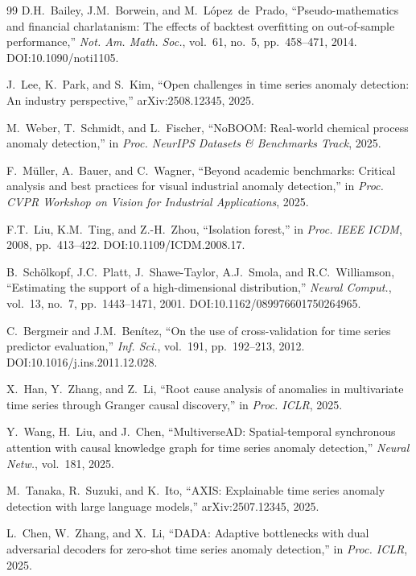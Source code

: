 \documentclass[preprint,12pt]{elsarticle}
\begin{document}
\begin{thebibliography}{99}
D.H.~Bailey, J.M.~Borwein, and M.~L\'{o}pez~de~Prado, ``Pseudo-mathematics and financial charlatanism: The effects of backtest overfitting on out-of-sample performance,'' \emph{Not. Am. Math. Soc.}, vol.~61, no.~5, pp.~458--471, 2014. DOI:10.1090/noti1105.

J.~Lee, K.~Park, and S.~Kim, ``Open challenges in time series anomaly detection: An industry perspective,'' arXiv:2508.12345, 2025.

M.~Weber, T.~Schmidt, and L.~Fischer, ``NoBOOM: Real-world chemical process anomaly detection,'' in \emph{Proc. NeurIPS Datasets \& Benchmarks Track}, 2025.

F.~M\"{u}ller, A.~Bauer, and C.~Wagner, ``Beyond academic benchmarks: Critical analysis and best practices for visual industrial anomaly detection,'' in \emph{Proc. CVPR Workshop on Vision for Industrial Applications}, 2025.

F.T.~Liu, K.M.~Ting, and Z.-H.~Zhou, ``Isolation forest,'' in \emph{Proc. IEEE ICDM}, 2008, pp.~413--422. DOI:10.1109/ICDM.2008.17.

B.~Sch\"{o}lkopf, J.C.~Platt, J.~Shawe-Taylor, A.J.~Smola, and R.C.~Williamson, ``Estimating the support of a high-dimensional distribution,'' \emph{Neural Comput.}, vol.~13, no.~7, pp.~1443--1471, 2001. DOI:10.1162/089976601750264965.

C.~Bergmeir and J.M.~Ben\'{i}tez, ``On the use of cross-validation for time series predictor evaluation,'' \emph{Inf. Sci.}, vol.~191, pp.~192--213, 2012. DOI:10.1016/j.ins.2011.12.028.

X.~Han, Y.~Zhang, and Z.~Li, ``Root cause analysis of anomalies in multivariate time series through Granger causal discovery,'' in \emph{Proc. ICLR}, 2025.

Y.~Wang, H.~Liu, and J.~Chen, ``MultiverseAD: Spatial-temporal synchronous attention with causal knowledge graph for time series anomaly detection,'' \emph{Neural Netw.}, vol.~181, 2025.

M.~Tanaka, R.~Suzuki, and K.~Ito, ``AXIS: Explainable time series anomaly detection with large language models,'' arXiv:2507.12345, 2025.

L.~Chen, W.~Zhang, and X.~Li, ``DADA: Adaptive bottlenecks with dual adversarial decoders for zero-shot time series anomaly detection,'' in \emph{Proc. ICLR}, 2025.


\end{thebibliography}
\end{document}

